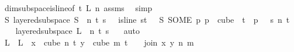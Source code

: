 \begin{isabellebody}
\ dim{}{\isacharunderscore}{\kern0pt}subspace{\isacharunderscore}{\kern0pt}is{\isacharunderscore}{\kern0pt}line{\isacharbrackleft}{\kern0pt}of\ {\isachardoublequoteopen}t{\isacharplus}{\kern0pt}{}{\isachardoublequoteclose}\ {\isachardoublequoteopen}L{\isachardoublequoteclose}\ {\isachardoublequoteopen}n{\isachardoublequoteclose}{\isacharbrackright}{\kern0pt}\ assms{\isacharparenleft}{\kern0pt}{}{\isacharparenright}{\kern0pt}\ \isamarkupfalse%
\ simp\isanewline
\ \ \ \ \ \ \isamarkupfalse%
\ \isamarkupfalse%
\ {\isachardoublequoteopen}{\isasymexists}S{\isachardot}{\kern0pt}\ layered{\isacharunderscore}{\kern0pt}subspace\ S\ {}\ n\ t\ s\ {\isasymchi}\ {\isasymand}\ is{\isacharunderscore}{\kern0pt}line\ {\isacharparenleft}{\kern0pt}{\isasymlambda}s{\isasymin}{\isacharbraceleft}{\kern0pt}{\isachardot}{\kern0pt}{\isachardot}{\kern0pt}{\isacharless}{\kern0pt}t\ {\isacharplus}{\kern0pt}\ {}{\isacharbraceright}{\kern0pt}{\isachardot}{\kern0pt}\ S\ {\isacharparenleft}{\kern0pt}SOME\ p{\isachardot}{\kern0pt}\ p\ {\isasymin}\ cube\ {}\ {\isacharparenleft}{\kern0pt}t{\isacharplus}{\kern0pt}{}{\isacharparenright}{\kern0pt}\ {\isasymand}\ p\ {}\ {\isacharequal}{\kern0pt}\ s{\isacharparenright}{\kern0pt}{\isacharparenright}{\kern0pt}\ n\ {\isacharparenleft}{\kern0pt}t\ {\isacharplus}{\kern0pt}\ {}{\isacharparenright}{\kern0pt}{\isachardoublequoteclose}\ \isamarkupfalse%
\ {\isacartoucheopen}layered{\isacharunderscore}{\kern0pt}subspace\ L\ {}\ n\ t\ s\ {\isasymchi}{\isacartoucheclose}\ \isamarkupfalse%
\ auto\isanewline
\ \ \ \ \isamarkupfalse%
\isanewline
\isanewline
\isanewline
\ \ \isanewline
\isanewline
\isanewline
\ \ \ \ \isamarkupfalse%
\ {\isasymchi}L\ \ {\isachardoublequoteopen}{\isasymchi}L\ {\isasymequiv}\ {\isacharparenleft}{\kern0pt}{\isasymlambda}x\ {\isasymin}\ cube\ n\ {\isacharparenleft}{\kern0pt}t{\isacharplus}{\kern0pt}{}{\isacharparenright}{\kern0pt}{\isachardot}{\kern0pt}\ {\isacharparenleft}{\kern0pt}{\isasymlambda}y\ {\isasymin}\ cube\ m\ {\isacharparenleft}{\kern0pt}t\ {\isacharplus}{\kern0pt}\ {}{\isacharparenright}{\kern0pt}{\isachardot}{\kern0pt}\ {\isasymchi}\ {\isacharparenleft}{\kern0pt}join\ x\ y\ n\ m{\isacharparenright}{\kern0pt}{\isacharparenright}{\kern0pt}{\isacharparenright}{\kern0pt}{\isachardoublequoteclose}\isanewline
\ \ \ \ \isamarkupfalse%

\end{isabellebody}
